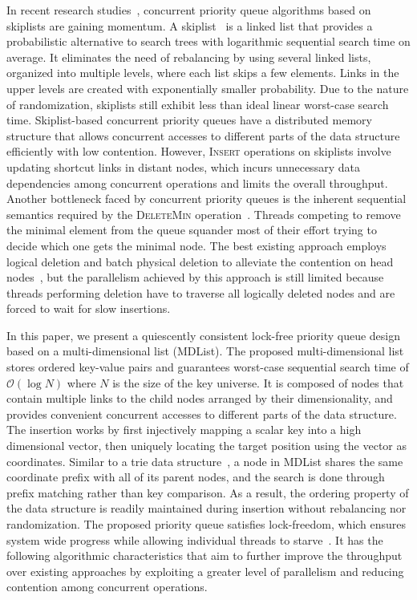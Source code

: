 \documentclass[10pt,journal,letter,compsoc]{IEEEtran}
\begin{document}
In recent research studies~\cite{linden2013skiplist,sundell2005fast,herlihy2006provably,fraser2007concurrent}, concurrent priority queue algorithms based on skiplists are gaining momentum.
A skiplist~\cite{pugh1990skip} is a linked list that provides a probabilistic alternative to search trees with logarithmic sequential search time on average. 
It eliminates the need of rebalancing by using several linked lists, organized into multiple levels, where each list skips a few elements. 
Links in the upper levels are created with exponentially smaller probability.
Due to the nature of randomization, skiplists still exhibit less than ideal linear worst-case search time.
Skiplist-based concurrent priority queues have a distributed memory structure that allows concurrent accesses to different parts of the data structure efficiently with low contention. 
However, \textsc{Insert} operations on skiplists involve updating shortcut links in distant nodes, which incurs unnecessary data dependencies among concurrent operations and limits the overall throughput.
Another bottleneck faced by concurrent priority queues is the inherent sequential semantics required by the \textsc{DeleteMin} operation~\cite{ellen2012inherent}.
Threads competing to remove the minimal element from the queue squander most of their effort trying to decide which one gets the minimal node.
The best existing approach employs logical deletion and batch physical deletion to alleviate the contention on head nodes~\cite{linden2013skiplist}, but the parallelism achieved by this approach is still limited because threads performing deletion have to traverse all logically deleted nodes and are forced to wait for slow insertions.

In this paper, we present a quiescently consistent lock-free priority queue design based on a multi-dimensional list (MDList).
The proposed multi-dimensional list stores ordered key-value pairs and guarantees worst-case sequential search time of $\mathcal{O}(\log N)$ where $N$ is the size of the key universe.
It is composed of nodes that contain multiple links to the child nodes arranged by their dimensionality, and provides convenient concurrent accesses to different parts of the data structure.
The insertion works by first injectively mapping a scalar key into a high dimensional vector, then uniquely locating the target position using the vector as coordinates.
Similar to a trie data structure~\cite{willard1983log}, a node in MDList shares the same coordinate prefix with all of its parent nodes, and the search is done through prefix matching rather than key comparison.
As a result, the ordering property of the data structure is readily maintained during insertion without rebalancing nor randomization.
The proposed priority queue satisfies lock-freedom, which ensures system wide progress while allowing individual threads to starve~\cite{herlihy2012art}.
It has the following algorithmic characteristics that aim to further improve the throughput over existing approaches by exploiting a greater level of parallelism and reducing contention among concurrent operations.
\end{document}
